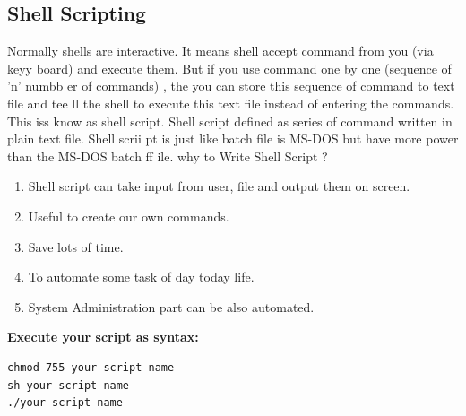 \subsection{Shell Scripting}
Normally shells are interactive. It means shell accept command from you (via keyy
board) and execute them. But if you use command one by one (sequence of 'n' numbb
er of commands) , the you can store this sequence of command to text file and tee
ll the shell to execute this text file instead of entering the commands. This iss
 know as shell script.
Shell script defined as series of command written in plain text file. Shell scrii
pt is just like batch file is MS-DOS but have more power than the MS-DOS batch ff
ile.
why to Write Shell Script ?
\begin{enumerate}
\item Shell script can take input from user, file and output them on screen.
\item Useful to create our own commands.
\item Save lots of time.
\item To automate some task of day today life.
\item System Administration part can be also automated.
\end{enumerate}
{ \bf Execute your script as syntax:}
\begin{verbatim}
chmod 755 your-script-name
sh your-script-name
./your-script-name
\end{verbatim}

